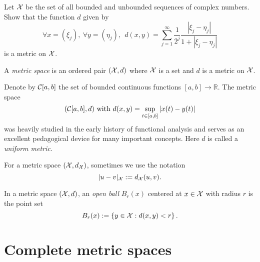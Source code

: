 \begin{exc}
  Let ${\cal X}$ be the set of all bounded and unbounded sequences
  of complex numbers. Show that the function $d$ given by
  \begin{equation}
    \label{eq:complexSequenceMetric}
    \forall x=(\xi_j),\ \forall y=(\eta_j),\ \ 
    d(x,y) = \sum_{j=1}^{\infty} \frac{1}{2^j}
    \frac{|\xi_j-\eta_j|}{1+|\xi_j-\eta_j|}
  \end{equation}
  is a metric on ${\cal X}$.
\end{exc}

\begin{defn}
  \label{def:metricSpace}
  A \emph{metric space} is an ordered pair $({\cal X}, d)$
  where ${\cal X}$ is a set and $d$ is a metric on ${\cal X}$.
\end{defn}

\begin{exm}
  \label{exm:continuousMapMetricSpace}
  Denote by ${\cal C}[a,b]$
  the set of bounded continuous functions
  $[a,b]\rightarrow \mathbb{R}$.
  The metric space 
  \begin{equation}
    \label{eq:CabMetricSpace}
    ({\cal C}[a,b],d) \text{ with }
    d(x,y)=\sup_{t\in[a,b]}|x(t)-y(t)|
  \end{equation}
  was heavily studied
  in the early history of functional analysis
  and serves as an excellent pedagogical device
  for many important concepts. 
  Here $d$ is called a \emph{uniform metric}.
\end{exm}

\begin{ntn}
  For a metric space $({\cal X},d_{{\cal X}})$,
  sometimes we use the notation
  \begin{equation}
    \label{eq:distanceNotation}
    |u-v|_{{\cal X}} := d_{{\cal X}}(u,v).
  \end{equation}
\end{ntn}

\begin{defn}
  \label{def:openBallMetricSpace}
  In a metric space $({\cal X},d)$,
  an \emph{open ball} $B_r(x)$ centered at $x\in {\cal X}$
  with radius $r$ is the point set
  \begin{equation}
    \label{eq:openBallMetricSpace}
    B_r(x) := \left\{y\in {\cal X}: d(x,y)<r\right\}.
  \end{equation}
\end{defn}


\section{Complete metric spaces}
\label{sec:compl-conv}

